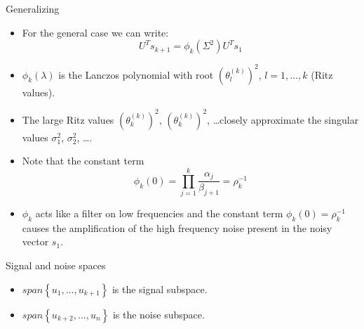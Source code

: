 \documentclass{beamer}
\begin{document}
\begin{frame}{Generalizing}
  \begin{itemize}
    \item For the general case we can write:
      \begin{equation*}
	U^{T}s_{k+1} = \phi_{k}(\Sigma^{2})U^{T}s_{1}
      \end{equation*}

    \item $\phi_{k}(\lambda)$ is the Lanczos polynomial with root 
      $(\theta_{l}^{(k)})^{2}$, $l = 1,\ldots,k$ (Ritz values).

    \item The large Ritz values $(\theta_{k}^{(k)})^{2}$, 
      $(\theta_{k}^{(k)})^{2}$, \ldots closely approximate the singular values
      $\sigma_{1}^{2}$, $\sigma_{2}^{2}$, \ldots.

    \item Note that the constant term
      \begin{equation*}
	\phi_{k}(0) = \prod_{j=1}^{k}\frac{\alpha_{j}}{\beta_{j+1}} = 
	\rho_{k}^{-1}
      \end{equation*}
  \end{itemize}
\end{frame}

\begin{frame}
  \begin{center}
  \end{center}
  \begin{itemize}
    \item $\phi_{k}$ acts like a filter on low frequencies and the constant term
      $\phi_{k}(0) = \rho_{k}^{-1}$ causes the amplification of the high
      frequency noise present in the noisy vector $s_{1}$.
  \end{itemize}
\end{frame}

\begin{frame}{Signal and noise spaces}
  \begin{center}
  \end{center}
  \begin{itemize}
    \item $span\left\{u_{1},\ldots,u_{k+1}\right\}$ is the signal subspace.
    \item $span\left\{u_{k+2},\ldots,u_{n}\right\}$ is the noise subspace.
  \end{itemize}
\end{frame}
\end{document}
